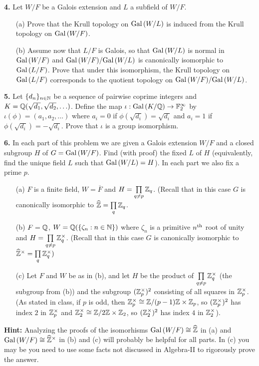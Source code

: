 \documentclass[12pt]{amsart}
\begin{document}
{\bf 4.} Let $W/F$ be a Galois extension and $L$ a subfield of $W/F$.
\begin{itemize}
\item[(a)] Prove that the Krull topology on ${\rm Gal\,}(W/L)$ is induced from the Krull topology on ${\rm Gal\,}(W/F)$.
\item[(b)] Assume now that $L/F$ is Galois, so that ${\rm Gal\,}(W/L)$ is normal in ${\rm Gal\,}(W/F)$ and ${\rm Gal\,}(W/F)/{\rm Gal\,}(W/L)$ is canonically isomorphic to
${\rm Gal\,}(L/F)$. Prove that under this isomorphism, the Krull topology on ${\rm Gal\,}(L/F)$ corresponds to the quotient topology on ${\rm Gal\,}(W/F)/{\rm Gal\,}(W/L)$.  
\end{itemize}
\skv

{\bf 5.} Let $\{d_n\}_{n\in{\mathbb N}}$ be a sequence of pairwise coprime integers and $K={\mathbb Q}(\sqrt{d_1},\sqrt{d_2},\ldots)$. Define
the map $\iota: {\rm Gal\,}(K/{\mathbb Q})\to{\mathbb F}_2^{\infty}$ by $\iota(\phi)=(a_1,a_2,\ldots)$ where $a_i=0$ if $\phi(\sqrt{d_i})=\sqrt{d_i}$ and
$a_i=1$ if $\phi(\sqrt{d_i})=-\sqrt{d_i}$. Prove that $\iota$ is a group isomorphism.
\skv


{\bf 6.} In each part of this problem we are given a Galois extension $W/F$ and a closed subgroup $H$ of $G={\rm Gal\,}(W/F)$. Find (with proof)
the fixed $L$ of $H$ (equivalently, find the unique field $L$ such that ${\rm Gal\,}(W/L)=H$). In each part we also fix a prime $p$.
\begin{itemize}
\item[(a)] $F$ is a finite field, $W=\overline F$ and $H=\prod\limits_{q\neq p}{\mathbb Z}_q$. (Recall that in this case
$G$ is canonically isomorphic to $\widehat{{\mathbb Z}}=\prod\limits_{q} {\mathbb Z}_q$.
\item[(b)] $F={\mathbb Q}$, $W={\mathbb Q}(\{\zeta_{n}: n\in{\mathbb N}\})$ where $\zeta_{n}$ is a primitive $n^{\rm th}$ root of unity and 
$H=\prod\limits_{q\neq p}{\mathbb Z}_q^{\times}$. (Recall that in this case $G$ is canonically isomorphic to $\widehat{{\mathbb Z}}^{\times}=\prod\limits_q {\mathbb Z}_q^{\times})$ 
\item[(c)] Let $F$ and $W$ be as in (b), and let $H$ be the product of $\prod\limits_{q\neq p}{\mathbb Z}_q^{\times}$ (the subgroup from (b))
and the subgroup $({\mathbb Z}_p^{\times})^2$ consisting of all squares in ${\mathbb Z}_p^{\times}$. (As stated in class, if $p$ is odd, then
${\mathbb Z}_p^{\times}\cong {\mathbb Z}/(p-1){\mathbb Z}\times {\mathbb Z}_p$, so $({\mathbb Z}_p^{\times})^2$ has index $2$ in ${\mathbb Z}_p^{\times}$ and
${\mathbb Z}_2^{\times}\cong {\mathbb Z}/2{\mathbb Z}\times {\mathbb Z}_2$, so $({\mathbb Z}_2^{\times})^2$ has index $4$ in ${\mathbb Z}_2^{\times}$).
\end{itemize} 
{\bf Hint:} Analyzing the proofs of the isomorhisms ${\rm Gal\,}(W/F)\cong \widehat{{\mathbb Z}}$ in (a) and ${\rm Gal\,}(W/F)\cong \widehat{{\mathbb Z}}^{\times}$ in (b) and (c) will probably be helpful for all parts. In (c) you may be you need to use some facts not discussed in Algebra-II to rigorously prove the answer.
\end{document}
